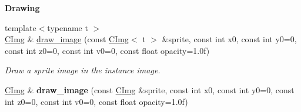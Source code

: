 \begin{Indent}{\bf Drawing}
\begin{DoxyCompactItemize}
\item 
{\footnotesize template$<$typename t $>$ }\\\hyperlink{structcimg__library_1_1_c_img}{C\-Img} \& \hyperlink{structcimg__library_1_1_c_img_a4516c4c43a7130f034172df71bbaefa4}{draw\-\_\-image} (const \hyperlink{structcimg__library_1_1_c_img}{C\-Img}$<$ t $>$ \&sprite, const int x0, const int y0=0, const int z0=0, const int v0=0, const float opacity=1.\-0f)
\begin{DoxyCompactList}\small\item\em Draw a sprite image in the instance image. \end{DoxyCompactList}\item 
\hypertarget{structcimg__library_1_1_c_img_aa813dae24ca3656340b874ca7fbc7938}{\hyperlink{structcimg__library_1_1_c_img}{C\-Img} \& {\bfseries draw\-\_\-image} (const \hyperlink{structcimg__library_1_1_c_img}{C\-Img} \&sprite, const int x0, const int y0=0, const int z0=0, const int v0=0, const float opacity=1.\-0f)}\label{structcimg__library_1_1_c_img_aa813dae24ca3656340b874ca7fbc7938}


\end{DoxyCompactItemize}
\end{Indent}
